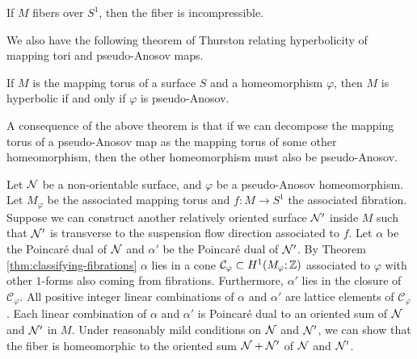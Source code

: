 \begin{fact}
  If $M$ fibers over $S^1$, then the fiber is incompressible.
\end{fact}

We also have the following theorem of Thurston relating hyperbolicity of mapping tori and pseudo-Anosov maps.
\begin{thm}
  If $M$ is the mapping torus of a surface $S$ and a homeomorphism $\varphi$, then $M$ is hyperbolic if and only if $\varphi$ is pseudo-Anosov.
\end{thm}

A consequence of the above theorem is that if we can decompose the mapping torus of a pseudo-Anosov map as the mapping torus of some other homeomorphism, then the other homeomorphism must also be pseudo-Anosov.

Let $\mathcal{N}$ be a non-orientable surface, and $\varphi$ be a pseudo-Anosov homeomorphism.
Let $M_\varphi$ be the associated mapping torus and $f:M\rightarrow S^1$ the associated fibration.
Suppose we can construct another relatively oriented surface $\mathcal{N}'$ inside $M$ such that $\mathcal{N}'$ is transverse to the suspension flow direction associated to $f$.
Let $\alpha$ be the Poincar\'e dual of $\mathcal{N}$ and $\alpha'$ be the Poincar\'e dual of $\mathcal{N}'$.
By Theorem \ref{thm:classifying-fibrations} $\alpha$ lies in a cone $\mathcal{C}_\varphi \subset H^1(M_\varphi; \mathbb{Z})$ associated to $\varphi$ with other $1$-forms also coming from fibrations.
Furthermore, $\alpha'$ lies in the closure of $\mathcal{C}_\varphi$.
All positive integer linear combinations of $\alpha$ and $\alpha'$ are lattice elements of $\mathcal{C}_\varphi$.
Each linear combination of $\alpha$ and $\alpha'$ is Poincar\'e dual to an oriented sum of $\mathcal{N}$ and $\mathcal{N}'$ in $M$.
Under reasonably mild conditions on $\mathcal{N}$ and $\mathcal{N}'$, we can show that the fiber is homeomorphic to the oriented sum $\mathcal{N} + \mathcal{N}'$ of $\mathcal{N}$ and $\mathcal{N}'$.

